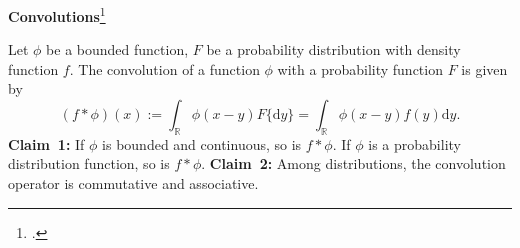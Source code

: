 \documentclass[19pt,landscape]{article}
\newcommand{\R}{\mathbb{R}}
\begin{document}
\newpage
{\LARGE\centerline{\textbf{Convolutions}\footnote{\cite[Chapter V, Section~4]{fellerv2}.} }}
\vskip25pt
\begin{minipage}{0.9\textwidth}
    \Large 
    Let $\phi$ be a bounded function, $F$ be a probability distribution with density function $f$. The convolution of a function $\phi$ with a probability function $F$ is given by 
    \begin{equation}
        \left(f*\phi\right)(x):=\int_{\R}\phi(x-y)F\{\mathrm{d}y\}=\int_{\R}\phi(x-y)f(y)\mathrm{d}y.
    \end{equation}
    {\bf Claim~1:} If $\phi$ is bounded and continuous, so is $f*\phi$. If $\phi$ is a probability distribution function, so is $f*\phi$.
    \vskip 5pt
    {\bf Claim~2:} Among distributions, the convolution operator is commutative and associative. 
\end{minipage}
\end{document}

